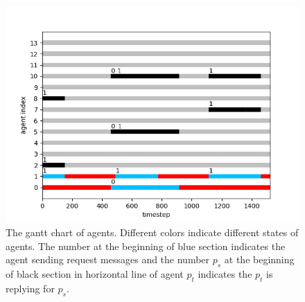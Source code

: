 \documentclass[journal]{IEEEtran}
\begin{document}
\begin{figure}[h]	
\centering  	
\includegraphics[width=1\linewidth]{simulate1/gante_no_grid.png}
\caption{The gantt chart of agents. Different colors indicate different states of agents. The number at the beginning of blue section indicates the agent sending request messages and the number $p_s$ at the beginning of black section in horizontal line of agent $p_t$ indicates the $p_t$ is replying for $p_s$.}
\label{Gantt}
\end{figure}

%
\end{document}
